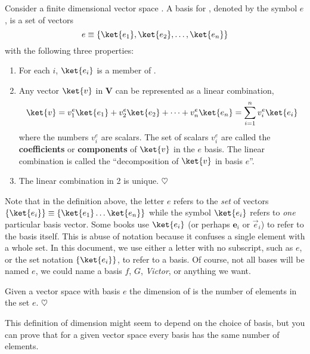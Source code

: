 \begin{definition}[Basis]
Consider a finite dimensional vector space \VS.
A basis for \VS, denoted by the symbol $e$, is a set of vectors
\begin{displaymath}
e \equiv \{\ket{e_1}, \ket{e_2}, \ldots, \ket{e_n}\}
\end{displaymath}
with the following three properties:
\begin{enumerate}
\item
For each $i$, $\ket{e_i}$ is a member of \VS.
\item
Any vector $\ket{v}$ in \textbf{V} can be represented as a linear combination,
\begin{displaymath}
\ket{v} = v^e_1 \ket{e_1} + v^e_2 \ket{e_2} + \cdots + v^e_n \ket{e_n} = \sum_{i=1}^n v^e_i \ket{e_i}
\end{displaymath}
where the numbers $v_i^e$ are scalars.
The set of scalars $v_i^e$ are called the \textbf{coefficients} or \textbf{components} of $\ket{v}$ in the $e$ basis.
The linear combination is called the ``decomposition of $\ket{v}$ in basis $e$''.
\item
The linear combination in 2 is unique. \qquad $\heartsuit$
\end{enumerate}
\end{definition}
Note that in the definition above, the letter $e$ refers to the \textit{set} of vectors $\{\ket{e_i}\} \equiv \{ \ket{e_1} \ldots \ket{e_n} \}$ while the symbol $\ket{e_i}$ refers to \emph{one} particular basis vector.
Some books use $\ket{e_i}$ (or perhaps $\mathbf{e}_i$ or $\vec{e}_i$) to refer to the basis itself.
This is abuse of notation because it confuses a single element with a whole set.
In this document, we use either a letter with no subscript, such as $e$, or the set notation $\{\ket{e_i}\}$, to refer to a basis.
Of course, not all bases will be named $e$, we could name a basis $f$, $G$, \textit{Victor}, or anything we want.

\begin{definition}[Dimension]
Given a vector space \VS with basis $e$ the dimension of \VS is the number of elements in the set $e$. \qquad $\heartsuit$
\end{definition}
This definition of dimension might seem to depend on the choice of basis, but you can prove that for a given vector space every basis has the same number of elements.


